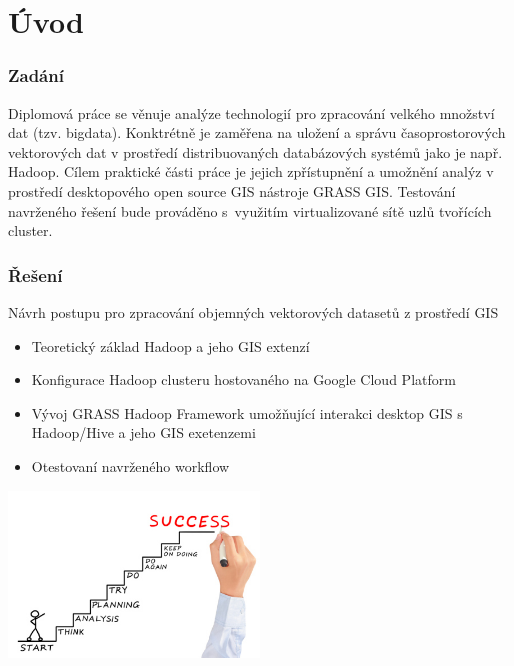 \documentclass[unicode,bookmarksnumbered]{beamer}
\begin{document}
%

	\section{Úvod}  %
	\begin{frame}
		\frametitle{Zadání}
Diplomová práce se věnuje analýze technologií pro zpracování velkého množství dat (tzv. bigdata). Konktrétně je zaměřena na uložení a správu časoprostorových vektorových dat v prostředí distribuovaných databázových systémů jako je např. Hadoop. Cílem praktické části práce je jejich zpřístupnění a umožnění analýz v prostředí desktopového open source GIS nástroje GRASS GIS. Testování navrženého řešení bude prováděno s využitím virtualizované sítě uzlů tvořících cluster.

	\end{frame}
%

	\begin{frame}
		\frametitle{Řešení}
		Návrh postupu pro zpracování objemných vektorových datasetů z prostředí GIS
		\begin{itemize}
			\item Teoretický základ Hadoop a jeho GIS extenzí
			\item Konfigurace Hadoop clusteru hostovaného na Google Cloud Platform
			\item Vývoj GRASS Hadoop Framework umožňující interakci desktop GIS s Hadoop/Hive a jeho GIS exetenzemi
			\item Otestovaní navrženého workflow
		\end{itemize}
		\includegraphics[width=0.5\textwidth]{./img/motivace/zadani.jpg}
	\end{frame}
%
\end{document}
